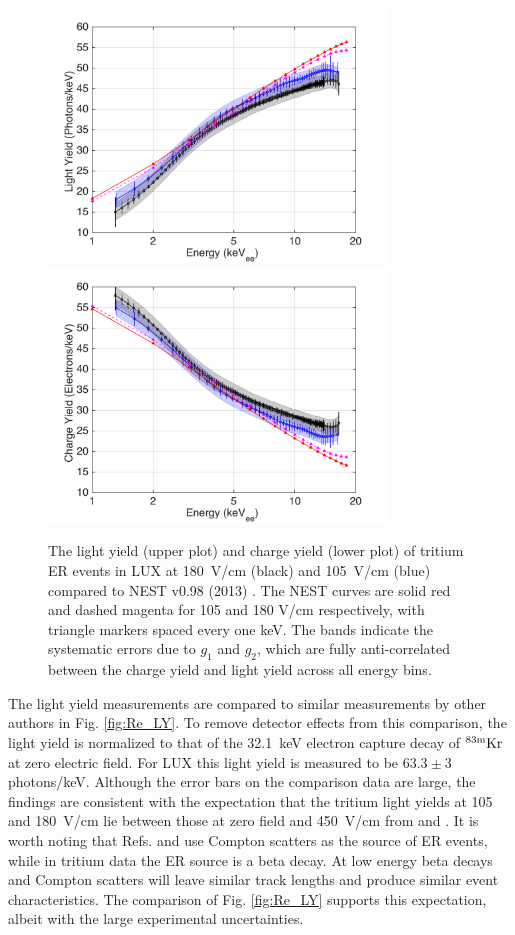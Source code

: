 \begin{figure}[h!]
\includegraphics[width=90mm]{fig/ER_LY.png}
\includegraphics[width=90mm]{fig/ER_QY.png}
\caption{The light yield (upper plot) and charge yield (lower plot) of tritium ER events in LUX at 180~V/cm (black) and 105~V/cm (blue) compared to NEST v0.98 (2013) \cite{NEST_2013}. The NEST curves are solid red and dashed magenta for 105 and 180 V/cm respectively, with triangle markers spaced every one keV. The bands indicate the systematic errors due to $g_1$ and $g_2$, which are fully anti-correlated between the charge yield and light yield across all energy bins. }
\label{fig:ER-LY-QY}
\end{figure}

The light yield measurements are compared to similar measurements by other authors in Fig. \ref{fig:Re_LY}. To remove detector effects from this comparison, the light yield is normalized to that of the 32.1~keV electron capture decay of $\rm ^{83m} Kr$ at zero electric field. For LUX this light yield is measured to be $ 63.3 \pm 3$ photons/keV. Although the error bars on the comparison data are large, the findings are consistent with the expectation that the tritium light yields at 105 and 180~V/cm lie between those at zero field and 450~V/cm from \cite{Aprile_LY} and \cite{Baudis}. It is worth noting that Refs. \cite{Aprile_LY} and \cite{Baudis} use Compton scatters as the source of ER events, while in tritium data the ER source is a beta decay. At low energy beta decays and Compton scatters will leave similar track lengths and produce similar event characteristics. The comparison of Fig. \ref{fig:Re_LY} supports this expectation, albeit with the large experimental uncertainties.

